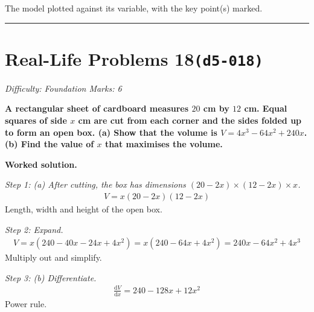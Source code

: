 \documentclass[11pt]{article}
\newcommand{\question}[1]{\par\medskip\noindent\textbf{#1}\par}
\begin{document}
\begin{center}
{
}
\end{center}
\small The model plotted against its variable, with the key point(s) marked.\normalsize

\medskip\hrule

\section*{Real-Life Problems 18\quad\small\texttt{(d5-018)}}
\textit{Difficulty: Foundation \quad\textbar\quad Marks: 6}

\question{A rectangular sheet of cardboard measures \( 20 \) cm by \( 12 \) cm. Equal squares of side \( x \) cm are cut from each corner and the sides folded up to form an open box. (a) Show that the volume is \( V = 4x^3 - 64x^2 + 240x \). (b) Find the value of \( x \) that maximises the volume.}

\textbf{Worked solution.}

\textit{Step 1: (a) After cutting, the box has dimensions \( (20-2x) \times (12-2x) \times x \).}
\[\begin{gathered}
V = x(20-2x)(12-2x)
\end{gathered}\]
Length, width and height of the open box.

\textit{Step 2: Expand.}
\[\begin{gathered}
V = x(240 - 40x - 24x + 4x^2) = x(240 - 64x + 4x^2) = 240x - 64x^2 + 4x^3
\end{gathered}\]
Multiply out and simplify.

\textit{Step 3: (b) Differentiate.}
\[\begin{gathered}
\frac{\mathrm{d}V}{\mathrm{d}x} = 240 - 128x + 12x^2
\end{gathered}\]
Power rule.
\end{document}
